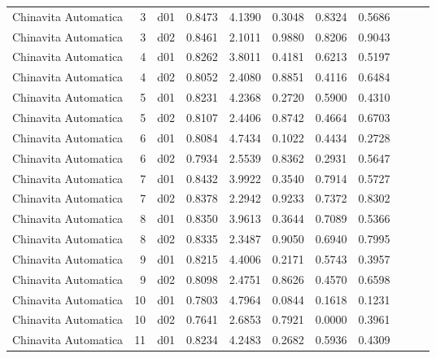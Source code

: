\begin{landscape}
\begin{longtable}{p{2cm}rrrrrrrrrr}
    Chinavita Automatica  &          3 &     d01 &   0.8473 &  4.1390 &        0.3048 &           0.8324 &  0.5686 \\
    Chinavita Automatica  &          3 &     d02 &   0.8461 &  2.1011 &        0.9880 &           0.8206 &  0.9043 \\
    Chinavita Automatica  &          4 &     d01 &   0.8262 &  3.8011 &        0.4181 &           0.6213 &  0.5197 \\
    Chinavita Automatica  &          4 &     d02 &   0.8052 &  2.4080 &        0.8851 &           0.4116 &  0.6484 \\
    Chinavita Automatica  &          5 &     d01 &   0.8231 &  4.2368 &        0.2720 &           0.5900 &  0.4310 \\
    Chinavita Automatica  &          5 &     d02 &   0.8107 &  2.4406 &        0.8742 &           0.4664 &  0.6703 \\
    Chinavita Automatica  &          6 &     d01 &   0.8084 &  4.7434 &        0.1022 &           0.4434 &  0.2728 \\
    Chinavita Automatica  &          6 &     d02 &   0.7934 &  2.5539 &        0.8362 &           0.2931 &  0.5647 \\
    Chinavita Automatica  &          7 &     d01 &   0.8432 &  3.9922 &        0.3540 &           0.7914 &  0.5727 \\
    Chinavita Automatica  &          7 &     d02 &   0.8378 &  2.2942 &        0.9233 &           0.7372 &  0.8302 \\
    Chinavita Automatica  &          8 &     d01 &   0.8350 &  3.9613 &        0.3644 &           0.7089 &  0.5366 \\
    Chinavita Automatica  &          8 &     d02 &   0.8335 &  2.3487 &        0.9050 &           0.6940 &  0.7995 \\
    Chinavita Automatica  &          9 &     d01 &   0.8215 &  4.4006 &        0.2171 &           0.5743 &  0.3957 \\
    Chinavita Automatica  &          9 &     d02 &   0.8098 &  2.4751 &        0.8626 &           0.4570 &  0.6598 \\
    Chinavita Automatica  &         10 &     d01 &   0.7803 &  4.7964 &        0.0844 &           0.1618 &  0.1231 \\
    Chinavita Automatica  &         10 &     d02 &   0.7641 &  2.6853 &        0.7921 &           0.0000 &  0.3961 \\
    Chinavita Automatica  &         11 &     d01 &   0.8234 &  4.2483 &        0.2682 &           0.5936 &  0.4309 \\

\end{longtable}
\end{landscape}
